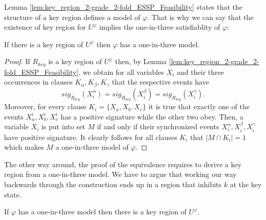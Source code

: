 \documentclass[english]{lipics_hacked}
\begin{document}
%
Lemma \ref{lem:key_region_2-grade_2-fold_ESSP_Feasibility} states that the structure of a key region defines a model of $\varphi$.
That is why we can say that the existence of key region for $U^\varphi$ implies the one-in-three satisfiablity of $\varphi$:
%
\begin{lemma}
\label{lem:Key_region_then_Model_2-grade_2-fold_ESSP_Feasibility}
If there is a key region of $U^\varphi$ then $\varphi$ has a one-in-three model.
\end{lemma}

\begin{proof}
If $R_{key}$ is a key region of $U^\varphi$ then, by Lemma \ref{lem:key_region_2-grade_2-fold_ESSP_Feasibility}, we obtain for all variables $X_i$ and their three occurrences in clauses $K_\alpha, K_\beta, K_\gamma$ that the respective events have
%
\[sig_{R_{key}}(X^\alpha_i)=sig_{R_{key}}(X^\beta_i)=sig_{R_{key}}(X^\gamma_i).\]
% 
Moreover, for every clause $K_i = \{X_a, X_b, X_c\}$ it is true that exactly one of the events $X^i_a, X^i_b, X^i_c$ has a positive signature while the other two obey.
Then, a variable $X_i$ is put into set $M$ if and only if their synchronized events $X^\alpha_i, X^\beta_i, X^\gamma_i$ have positive signature.
It clearly follows for all clauses $K_i$ that $|M \cap K_i| = 1$ which makes $M$ a one-in-three model of $\varphi$.
\end{proof}
%
The other way around, the proof of the equivalence requires to derive a key region from a one-in-three model.
We have to argue that working our way backwards through the construction ends up in a region that inhibits $k$ at the key state.
%
\begin{lemma}
\label{lem:Model_the_Key_Region_2-grade_2-fold_ESSP_Feasibility}
If $\varphi$ has a one-in-three model then there is a key region of $U^\varphi$.
\end{lemma}
\end{document}

